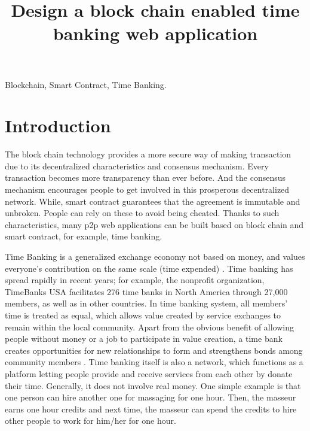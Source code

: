 \documentclass[conference]{IEEEtran}
\title{Design a block chain enabled time banking web application}
\author{
\IEEEauthorblockN{Xuheng Lin, Ronghua Xu, Yu Chen}
\IEEEauthorblockA{%
Dept. of Electrical and Computer Engineering, Binghamton University, SUNY, Binghamton, NY 13902, USA \\
\{rxu22, xlin84, ychen\}@binghamton.edu}
}
\begin{document}
\maketitle

\begin{abstract}


\end{abstract}

\begin{IEEEkeywords}
Blockchain, Smart Contract, Time Banking.
\end{IEEEkeywords}



\section{Introduction}
The block chain technology provides a more secure way of making transaction due to its decentralized characteristics and consensus mechanism. Every transaction becomes more transparency than ever before. And the consensus mechanism encourages people to get involved in this prosperous decentralized network. While, smart contract guarantees that the agreement is immutable and unbroken. People can rely on these to avoid being cheated. Thanks to such characteristics, many p2p web applications can be built based on block chain and smart contract, for example, time banking. 

Time Banking is a generalized exchange economy not based on money, and values everyone’s contribution on the same scale (time expended) \cite{carroll2013co}. Time banking has spread rapidly in recent years; for example, the nonprofit organization, TimeBanks USA \cite{TimeBanksUSA} facilitates 276 time banks in North America through 27,000 members, as well as in other countries. In time banking system, all members’ time is treated as equal, which allows value created by service exchanges to remain within the local community. Apart from the obvious benefit of allowing people without money or a job to participate in value creation, a time bank creates opportunities for new relationships to form and strengthens bonds among community members \cite{bellotti2014towards}. Time banking itself is also a network, which functions as a platform letting people provide and receive services from each other by donate their time. Generally, it does not involve real money. One simple example is that one person can hire another one for massaging for one hour. Then, the masseur earns one hour credits and next time, the masseur can spend the credits to hire other people to work for him/her for one hour.
\end{document}
